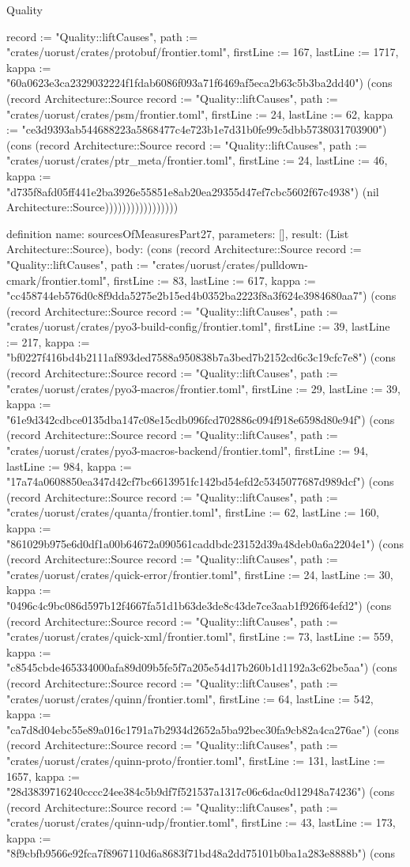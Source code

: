 \begin{lexlean}{Quality}
\begin{semanticmodule}
{{record := "Quality::liftCauses", path := "crates/uorust/crates/protobuf/frontier.toml", firstLine := 167, lastLine := 1717, kappa := "60a0623e3ca2329032224f1fdab6086f093a71f6469af5eca2b63c5b3ba2dd40"}) (cons (record Architecture::Source {record := "Quality::liftCauses", path := "crates/uorust/crates/psm/frontier.toml", firstLine := 24, lastLine := 62, kappa := "ce3d9393ab544688223a5868477c4e723b1e7d31b0fe99c5dbb5738031703900"}) (cons (record Architecture::Source {record := "Quality::liftCauses", path := "crates/uorust/crates/ptr_meta/frontier.toml", firstLine := 24, lastLine := 46, kappa := "d735f8afd05ff441e2ba3926e55851e8ab20ea29355d47ef7cbc5602f67c4938"}) (nil Architecture::Source)))))))))))))))))
}

definition{
  name: sourcesOfMeasuresPart27,
  parameters: [],
  result: (List Architecture::Source),
  body: (cons (record Architecture::Source {record := "Quality::liftCauses", path := "crates/uorust/crates/pulldown-cmark/frontier.toml", firstLine := 83, lastLine := 617, kappa := "cc458744eb576d0c8f9dda5275e2b15ed4b0352ba2223f8a3f624e3984680aa7"}) (cons (record Architecture::Source {record := "Quality::liftCauses", path := "crates/uorust/crates/pyo3-build-config/frontier.toml", firstLine := 39, lastLine := 217, kappa := "bf0227f416bd4b2111af893ded7588a950838b7a3bed7b2152cd6c3c19cfc7e8"}) (cons (record Architecture::Source {record := "Quality::liftCauses", path := "crates/uorust/crates/pyo3-macros/frontier.toml", firstLine := 29, lastLine := 39, kappa := "61e9d342cdbce0135dba147c08e15cdb096fcd702886c094f918e6598d80e94f"}) (cons (record Architecture::Source {record := "Quality::liftCauses", path := "crates/uorust/crates/pyo3-macros-backend/frontier.toml", firstLine := 94, lastLine := 984, kappa := "17a74a0608850ea347d42cf7bc6613951fc142bd54efd2c5345077687d989dcf"}) (cons (record Architecture::Source {record := "Quality::liftCauses", path := "crates/uorust/crates/quanta/frontier.toml", firstLine := 62, lastLine := 160, kappa := "861029b975e6d0df1a00b64672a090561caddbdc23152d39a48deb0a6a2204e1"}) (cons (record Architecture::Source {record := "Quality::liftCauses", path := "crates/uorust/crates/quick-error/frontier.toml", firstLine := 24, lastLine := 30, kappa := "0496c4c9bc086d597b12f4667fa51d1b63de3de8c43de7ce3aab1f926f64efd2"}) (cons (record Architecture::Source {record := "Quality::liftCauses", path := "crates/uorust/crates/quick-xml/frontier.toml", firstLine := 73, lastLine := 559, kappa := "c8545cbde465334000afa89d09b5fe5f7a205e54d17b260b1d1192a3c62be5aa"}) (cons (record Architecture::Source {record := "Quality::liftCauses", path := "crates/uorust/crates/quinn/frontier.toml", firstLine := 64, lastLine := 542, kappa := "ca7d8d04ebc55e89a016c1791a7b2934d2652a5ba92bec30fa9cb82a4ca276ae"}) (cons (record Architecture::Source {record := "Quality::liftCauses", path := "crates/uorust/crates/quinn-proto/frontier.toml", firstLine := 131, lastLine := 1657, kappa := "28d3839716240cccc24ee384c5b9df7f521537a1317c06c6dac0d12948a74236"}) (cons (record Architecture::Source {record := "Quality::liftCauses", path := "crates/uorust/crates/quinn-udp/frontier.toml", firstLine := 43, lastLine := 173, kappa := "8f9cbfb9566e92fca7f8967110d6a8683f71bd48a2dd75101b0ba1a283e8888b"}) (cons }
\end{semanticmodule}
\end{lexlean}
